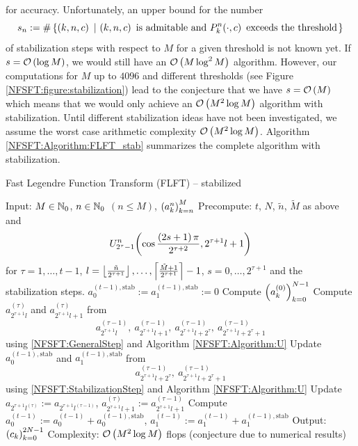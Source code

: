 for accuracy. Unfortunately, an upper bound for the number 
\[
  s_{n} := \#\left\{\left(k,n,c\right)\ \left|\ \left(k,n,c\right) \text{ is admitable and } P_{k}^n{\hspace{-0.4ex}}\left(\cdot,c\right) \text{ exceeds the threshold}\right.\right\rbrace
\] 
of stabilization steps with respect to $M$ for a given threshold is not known yet. If $s = \mathcal{O}\left(\log M\right)$, 
we would still have an $\mathcal{O}\left(M \log^2 M\right)$ algorithm. However, our computations for $M$ up to $4096$ and different 
thresholds (see Figure \ref{NFSFT:figure:stabilization}) lead to the conjecture  
that we have $s = \mathcal{O}\left(M\right)$ which means that we would only achieve an $\mathcal{O}\left(M^2 \log M\right)$ algorithm with stabilization. Until different stabilization ideas have not been investigated, we assume the worst 
case arithmetic complexity $\mathcal{O}\left(M^2 \log M\right)$.
Algorithm \ref{NFSFT:Algorithm:FLFT_stab} summarizes the complete algorithm with stabilization.
\begin{algorithm}[ht]
  \caption{Fast Legendre Function Transform (FLFT) -- stabilized}
  \label{NFSFT:Algorithm:FLFT_stab}    
  \begin{algorithmic}
    \STATE Input:  $M \in \mathbb{N}_{0}$, $n \in \mathbb{N}_{0}$ $(n \le M)$, $\left(a_k^n\right)_{k=n}^{M}$
    \STATE Precompute: $t$, $N$, $\tilde{n}$, $\tilde{M}$ as above and \[U_{2^{\tau}-1}^{n}{\hspace{-0.4ex}}\left(\cos \frac{\left(2s+1\right)\pi}{2^{\tau+2}}, 2^{\tau+1}l+1\right)\] 
    \STATE {} for $\tau = 1,\ldots,t-1$, $l = \left\lfloor\frac{\tilde{n}}{2^{\tau+1}}\right\rfloor,\ldots,\left\lceil\frac{\tilde{M}+1}{2^{\tau+1}}\right\rceil-1$, 
    \STATE {} $s = 0,\ldots,2^{\tau+1}$ and the stabilization steps.
    \STATE $a_{0}^{(t-1),\text{stab}} := a_{1}^{(t-1),\text{stab}} := 0$
    \STATE Compute $\left(a_{k}^{(0)}\right)_{k=0}^{N-1}$ 
          \STATE Compute $a_{2^{\tau+1}l}^{(\tau)}$ and $a_{2^{\tau+1}l+1}^{(\tau)}$ from \[a_{2^{\tau+1}l}^{(\tau-1)},\  
            a_{2^{\tau+1}l+1}^{(\tau-1)},\ a_{2^{\tau+1}l+2^{\tau}}^{(\tau-1)},\ a_{2^{\tau+1}l+2^{\tau}+1}^{(\tau-1)}\] using 
            \eqref{NFSFT:GeneralStep} and Algorithm \ref{NFSFT:Algorithm:U}
        \ELSE
          \STATE Update $a_{0}^{(t-1),\text{stab}}$ and $a_{1}^{(t-1),\text{stab}}$ from
            \[ 
              a_{2^{\tau+1}l+2^{\tau}}^{(\tau-1)},\ a_{2^{\tau+1}l+2^{\tau}+1}^{(\tau-1)}
            \] 
            using \eqref{NFSFT:StabilizationStep} and Algorithm \ref{NFSFT:Algorithm:U}
          \STATE Update $a_{2^{\tau+1}l^{(\tau)}} := a_{2^{\tau+1}l^{(\tau-1)}}$, $a_{2^{\tau+1}l+1}^{(\tau)} := a_{2^{\tau+1}l+1}^{(\tau-1)}$
        \ENDIF
      \ENDFOR
    \ENDFOR
    \STATE Compute $a_{0}^{(t-1)} := a_{0}^{(t-1)} + a_{0}^{(t-1),\text{stab}}$, $a_{1}^{(t-1)} := a_{1}^{(t-1)} + a_{1}^{(t-1),\text{stab}}$
    \STATE Output: $\left(c_{k}\right)_{k=0}^{2N-1}$
    \STATE Complexity: $\mathcal{O}\left(M^2 \log M\right)$ flops (conjecture due to numerical results)
\end{algorithmic}
\end{algorithm}

